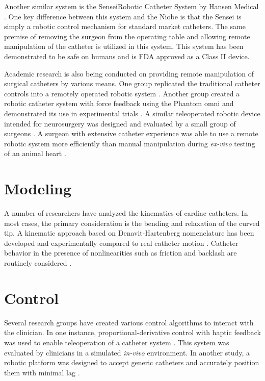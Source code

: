 \documentclass[letterpaper,10pt,conference]{ieeeconf}   %
\begin{document}
Another similar system is the SenseiRobotic Catheter System by Hansen Medical \cite{HansenMedical:Sensei}. One key difference between this system and the Niobe is that the Sensei is simply a robotic control mechanism for standard market catheters. The same premise of removing the surgeon from the operating table and allowing remote manipulation of the catheter is utilized in this system. This system has been demonstrated to be safe on humans \cite{saliba:08a} and is FDA approved as a Class II device. 

Academic research is also being conducted on providing remote manipulation of surgical catheters by various means. One group replicated the traditional catheter controls into a remotely operated robotic system \cite{thakur:09a}. Another group created a robotic catheter system with force feedback using the Phantom omni and demonstrated its use in experimental trials \cite{xiao2012robotic}. A similar teleoperated robotic device intended for neurosurgery was designed and evaluated by a small group of surgeons \cite{srimathveeravalli:10a}. A surgeon with extensive catheter experience was able to use a remote robotic system more efficiently than manual manipulation during \textit{ex-vivo} testing of an animal heart \cite{cercenelli:07a}. 


\section{Modeling}
\label{sec:modeling}

A number of researchers have analyzed the kinematics of cardiac catheters. In most cases, the primary consideration is the bending and relaxation of the curved tip. A kinematic approach based on Denavit-Hartenberg nomenclature has been developed and experimentally compared to real catheter motion \cite{ganji:09a}. Catheter behavior in the presence of nonlinearities such as friction and backlash are routinely considered \cite{hasanzadeh:17a}.

\section{Control}
\label{sec:Control}

Several research groups have created various control algorithms to interact with the clinician. In one instance, proportional-derivative control with haptic feedback was used to enable teleoperation of a catheter system \cite{srimathveeravalli:10a}. This system was evaluated by clinicians in a simulated \textit{in-vivo} environment. In another study, a robotic platform was designed to accept generic catheters and accurately position them with minimal lag \cite{thakur:09a}. 
\end{document}
